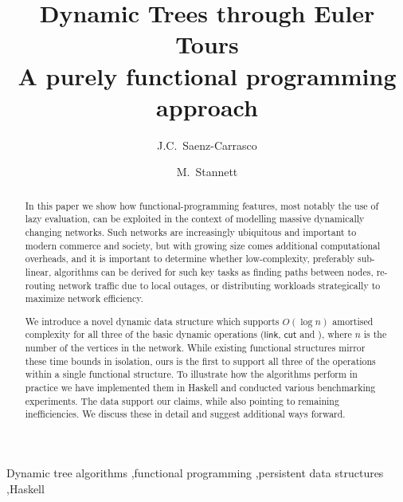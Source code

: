 \documentclass{elsarticle}
\newcommand{\MATHSF}[1]{\ensuremath{\mathsf{#1}}\xspace}
\newcommand{\link}{\MATHSF{link}}
\newcommand{\cut}{\MATHSF{cut}}
\begin{document}
\title{Dynamic Trees through Euler Tours\\%
\large{A purely functional programming approach}}

\author{J.C.~Saenz-Carrasco}

\author{M.~Stannett}

\address{Department of Computer Science,\\
Regent Court, 211 Portobello,\\
Sheffield S1 4DP, United Kingdom}


\begin{abstract}
In this paper we show how functional-programming features, most notably the use of lazy evaluation, can be exploited in the context of modelling massive dynamically changing networks. Such networks are increasingly ubiquitous and important to modern commerce and society, but with growing size comes additional computational overheads, and it is important to determine whether low-complexity, preferably sub-linear, algorithms can be derived for such key tasks as finding paths between nodes, re-routing network traffic due to local outages, or distributing workloads strategically to maximize network efficiency.

We introduce a novel dynamic data structure which supports $O(\log n)$ amortised complexity for all three of the basic dynamic operations (\link, \cut and \connected), where $n$ is the number of the vertices in the network. While existing functional structures mirror these time bounds in isolation, ours is the first to support all three of the operations within a single functional structure. To illustrate how the algorithms perform in practice we have implemented them in Haskell and conducted various benchmarking experiments. The data support our claims, while also pointing to remaining inefficiencies. We discuss these in detail and suggest additional ways forward.
\end{abstract}

\begin{keyword}
Dynamic tree algorithms \sep functional programming \sep persistent data structures \sep Haskell
\end{keyword}


\maketitle






%
 
 
 
 

\end{document}
